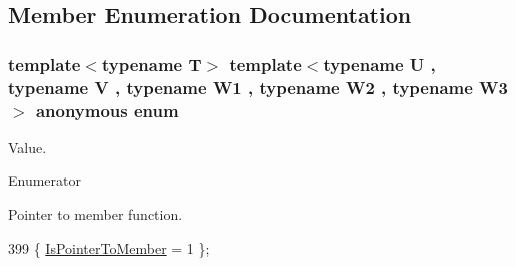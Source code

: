 \subsection{Member Enumeration Documentation}
\subsubsection[{\texorpdfstring{anonymous enum}{anonymous enum}}]{\setlength{\rightskip}{0pt plus 5cm}template$<$typename T$>$ template$<$typename U , typename V , typename W1 , typename W2 , typename W3 $>$ anonymous enum}\hypertarget{structTypeTraits_1_1PtrToMemberTraits_3_01U_07V_1_1_5_08_07W1_00_01W2_00_01W3_08_4_a1ef93afd4ae33275da3562780f4e4978}{}\label{structTypeTraits_1_1PtrToMemberTraits_3_01U_07V_1_1_5_08_07W1_00_01W2_00_01W3_08_4_a1ef93afd4ae33275da3562780f4e4978}
Value. \begin{Desc}
\item[Enumerator]\par
\begin{description}
\item[{\em 
Is\+Pointer\+To\+Member\hypertarget{structTypeTraits_1_1PtrToMemberTraits_3_01U_07V_1_1_5_08_07W1_00_01W2_00_01W3_08_4_a1ef93afd4ae33275da3562780f4e4978abaf36810ce3cd999b0774ec6ad9bdb0e}{}\label{structTypeTraits_1_1PtrToMemberTraits_3_01U_07V_1_1_5_08_07W1_00_01W2_00_01W3_08_4_a1ef93afd4ae33275da3562780f4e4978abaf36810ce3cd999b0774ec6ad9bdb0e}
}]Pointer to member function. \end{description}
\end{Desc}

\begin{DoxyCode}
399 \{ \hyperlink{structTypeTraits_1_1PtrToMemberTraits_3_01U_07V_1_1_5_08_07W1_00_01W2_00_01W3_08_4_a1ef93afd4ae33275da3562780f4e4978abaf36810ce3cd999b0774ec6ad9bdb0e}{IsPointerToMember} = 1    \};
\end{DoxyCode}
